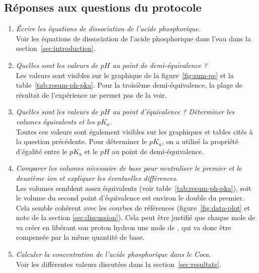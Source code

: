 \documentclass[11pt]{article}
\begin{document}
\subsection*{Réponses aux questions du protocole}
\begin{enumerate}
    \item \textit{Écrire les équations de dissociation de l'acide phosphorique.}\\
        Voir les équations de dissociation de l'acide phosphorique dans l'eau dans la section~\ref{sec:introduction}.
    \item \textit{Quelles sont les valeurs de $pH$ au point de demi-équivalence ?}\\
        Les valeurs sont visibles sur le graphique de la figure~\ref{fig:sum-pe} et la table~\ref{tab:resum-ph-pka}.
        Pour la troisième demi-équivalence, la plage de résultat de l'expérience ne permet pas de la voir.
    \item \textit{Quelles sont les valeurs de $pH$ au point d'équivalence ?
        Déterminer les volumes équivalents et les $pK_a$.}\\
        Toutes ces valeurs sont également visibles sur les graphiques et tables cités à la question précédente.
        Pour déterminer le $pK_a$, on a utilisé la propriété d'égalité entre le $pK_a$ et le $pH$ au point de
        demi-équivalence.
    \item \textit{Comparer les volumes nécessaire de base pour neutraliser le premier et le deuxième ion 
        et expliquer les éventuelles différences.}\\
        Les volumes semblent assez équivalents (voir table~\ref{tab:resum-ph-pka}), soit le volume du second point
        d'équivalence est environ le double du premier.
        Cela semble cohérent avec les courbes de références (figure~\ref{fig:data-plot} et note de la section \ref{sec:discussion}).
        Cela peut être justifié que chaque mole de  va créer en libérant son proton hydron une mole
        de , qui va donc être compensée par la même quantité de base.
    \item \textit{Calculer la concentration de l'acide phosphorique dans le Coca.}\\
        Voir les différentes valeurs discutées dans la section~\ref{sec:resultats}.
\end{enumerate}
\end{document}
